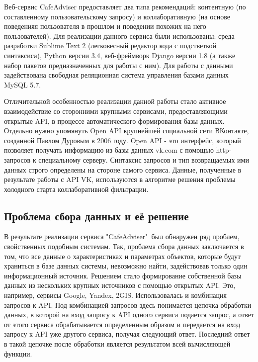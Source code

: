 Веб-сервис CafeAdviser предоставляет два типа рекомендаций: контентную (по составленному пользовательскому запросу) и коллаборативную (на основе поведенияя пользователя в прошлом и поведении похожих на него пользователей). Для реализации данного сервиса были использованы: среда разработки Sublime Text 2 (легковесный редактор кода с подстветкой синтаксиса), Python версии 3.4, веб-фреймворк Django версии 1.8 (а также набор пакетов предназначенных для работы с ним). Для работы с данными задействована свободная реляционная система управления базами данных MySQL 5.7.

Отличительной особенностью реализации данной работы стало активное взаимодействие со сторонними крупными сервисами, предоставляющими открытые API, в процессе автоматического формирования базы данных. Отдельно нужно упомянуть Open API крупнейшей социальной сети ВКонтакте, созданной Павлом Дуровым в 2006 году. Open API - это интерфейс, который позволяет получать информацию из базы данных vk.com с помощью http-запросов к специальному серверу. Синтаксис запросов и тип возвращаемых ими данных строго определены на стороне самого сервиса. Данные, полученные в результате работы с API VK, используются в алгоритме решения проблемы холодного старта коллаборативной фильтрации.

\subsection{Проблема сбора данных и её решение}

В результате реализации сервиса "CafeAdviser"\ был обнаружен ряд проблем, свойственных подобным системам. Так, проблема сбора данных заключается в том, что все данные о характеристиках и параметрах объектов, которые будут храниться в базе данных системы, невозможно найти, задействовав только один информационный источник. Решением стало формирование собственной базы данных из нескольких крупных источников с помощью открытых API. Это, например, сервисы Google, Yandex, 2GIS. Использовалась и комбинация запросов к API. Под комбинацией запросов здесь понимается цепочка обработки данных, в которой на вход запросу к API одного сервиса подается запрос, а ответ от этого сервиса обрабатывается определенным образом и передается на вход запросу к API уже другого сервиса, получая следующий ответ. Последний ответ в такой цепочке после обработки является результатом всей вычисляющей функции.

